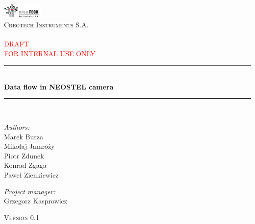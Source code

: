 \begin{titlepage}
\begin{center}

\includegraphics[width=0.15\textwidth]{pict/logo.png}~\\[1cm]

\textsc{\LARGE Creotech Instruments S.A.}\\[5.5cm]

\textsc{\Large \textcolor{red} {\\DRAFT \\ FOR INTERNAL USE ONLY} }\\[0.5cm]

\hrule \textcolor{white}{test}\\[0.4cm]	%
{ \huge \bfseries Data flow in NEOSTEL camera  \\[0.4cm] }
\hrule \textcolor{white}{test}\\[1.5cm] %
 
\noindent
\begin{minipage}{0.4\textwidth}
\begin{flushleft} \large
\emph{Authors:}\\
Marek Burza\\
Mikołaj Jamroży\\
Piotr Zdunek\\
Konrad Zgaga \\
Paweł Zienkiewicz\\
\end{flushleft}
\end{minipage}%
\begin{minipage}{0.4\textwidth}
\begin{flushright} \large
\emph{Project manager:} \\
Grzegorz Kasprowicz 
\end{flushright}
\end{minipage}

\vfill
\textsc{Version 0.1}\\[0.0cm]
{\date{\today}}

\end{center}
\end{titlepage}
